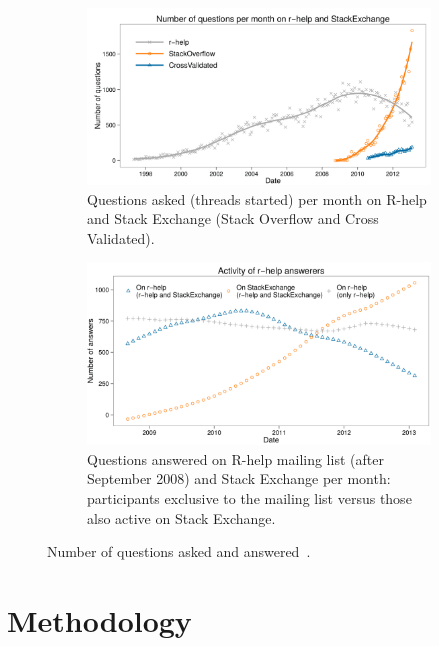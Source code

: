 \documentclass{sig-alternate-05-2015}
\begin{document}
	\begin{figure}
		\centering
	    \begin{subfigure}[b]{0.9\columnwidth}
	      \includegraphics[width=\columnwidth]{Figures/VasilescuFA1}
          \caption{Questions asked (threads started) per month on R-help and Stack Exchange (Stack Overflow and Cross Validated).}
	      \label{fig:VasilescuFA1-1}
        \end{subfigure}
	    \begin{subfigure}[b]{0.9\columnwidth}
	      \includegraphics[width=\columnwidth]{Figures/VasilescuFA2}
          \caption{Questions answered on R-help mailing list (after September 2008) and Stack Exchange per month: participants exclusive to the mailing list versus those also active on Stack Exchange.}
      	  \label{fig:VasilescuFA1-2}
        \end{subfigure}
		\caption{Number of questions asked and answered~\cite{Vasilescu2014c}.}
		\label{fig:VasilescuFA1}
	\end{figure}


\section{Methodology}
\label{cha:methodology}
\end{document}
